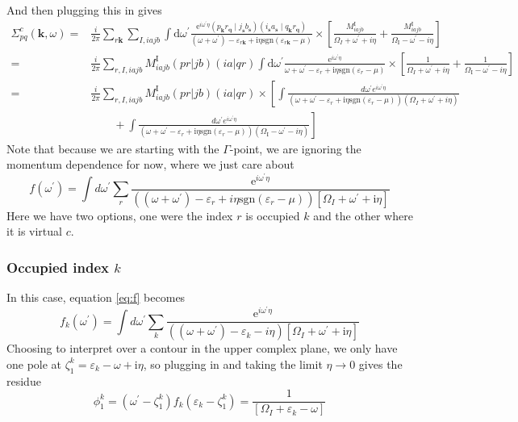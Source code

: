 \documentclass[12pt]{article}
\begin{document}
And then plugging this in gives
\begin{align}
    \Sigma _{p q}^c\left(\mathbf{k}, \omega\right) = {}& \frac{i}{2\pi} \sum_{r\mathbf{k}} \sum_{I,iajb} \int \mathrm{d} \omega^{\prime}  \frac{\mathrm{e}^{i \omega^{\prime}\eta}(p_{\mathbf{k}}r_\mathbf{q}\mid j_{\mathbf{s}}b_{\mathbf{s}})(i_{\mathbf{s}}a_{\mathbf{s}}\mid q_{\mathbf{k}}r_\mathbf{q})}{(\omega + \omega^{\prime}) - \varepsilon_{r\mathbf{k}} + \mathrm{i}\eta\text{sgn}(\varepsilon_{r\mathbf{k}} - \mu)} \times \left[\frac{M_{i a j b}^{\mathrm{I}}}{\Omega_I+\omega^{\prime}+i\eta}+\frac{M_{i a j b}^{\mathrm{I}}}{\Omega_{\mathrm{I}}-\omega^{\prime}-i\eta}\right]\\
    = {}& \frac{i}{2\pi} \sum_{r,I,iajb} M_{i a j b}^{\mathrm{I}} (pr|jb)(ia|qr) \int \mathrm{d} \omega^{\prime}  \frac{\mathrm{e}^{i \omega^{\prime}\eta}}{\omega + \omega^{\prime} - \varepsilon_{r} + \mathrm{i}\eta\text{sgn}(\varepsilon_{r} - \mu)}\times \left[\frac{1}{\Omega_I+\omega^{\prime}+i\eta}+\frac{1}{\Omega_{\mathrm{I}}-\omega^{\prime}-i\eta}\right] \\
    = {}& \frac{i}{2\pi} \sum_{r,I,iajb} M_{i a j b}^{\mathrm{I}} (pr|jb)(ia|qr)\times \left[\int \frac{d\omega^{\prime}e^{i\omega^{\prime}\eta}}{(\omega + \omega^{\prime} - \varepsilon_{r} + \mathrm{i}\eta\text{sgn}(\varepsilon_{r} - \mu))(\Omega_I+\omega^{\prime}+i\eta )} \right. \nonumber \\
    &\quad\quad + \left. \int \frac{d\omega^{\prime}e^{i\omega^{\prime}\eta}}{(\omega + \omega^{\prime} - \varepsilon_{r} + \mathrm{i}\eta\text{sgn}(\varepsilon_{r} - \mu))(\Omega_{\mathrm{I}}-\omega^{\prime}-i\eta)}\right]
\label{eq:SigmaC}
\end{align}
Note that because we are starting with the $\Gamma $-point, we are ignoring the momentum dependence for now, where we just care about
\begin{equation}
    f(\omega ^\prime) = \int d \omega^\prime \sum_r \frac{\mathrm{e}^{i \omega^{\prime}\eta}}{\left((\omega + \omega^{\prime}) - \varepsilon_{r} +i\eta\text{sgn}(\varepsilon_{r} - \mu)\right) \left[\Omega _I + \omega^\prime + \mathrm{i}\eta\right]}
\label{eq:f}
\end{equation}
Here we have two options, one were the index $r$ is occupied $k$ and the other where it is virtual $c$.
\subsubsection{Occupied index $k$}
In this case, equation \ref{eq:f} becomes
\begin{equation}
    f_k(\omega ^\prime) = \int d \omega^\prime \sum_k\frac{\mathrm{e}^{i \omega^{\prime}\eta}}{\left((\omega + \omega^{\prime}) - \varepsilon_{k} -i\eta\right) \left[\Omega _I + \omega^\prime + \mathrm{i}\eta\right]}
\end{equation}
Choosing to interpret over a contour in the upper complex plane, we only have one pole at $\zeta_1^k = \varepsilon_{k} - \omega + \mathrm{i}\eta$, so plugging in and taking the limit $\eta \to 0$ gives the residue
\begin{equation}
    \phi_1^k = \left(\omega^\prime - \zeta_1^k\right) f_k(\varepsilon_{k} - \zeta_1^k) = \frac{1}{ \left[\Omega _I + \varepsilon_{k} - \omega\right]}
\end{equation}
\end{document}
